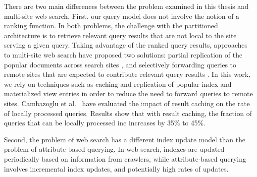 There are two main differences between the problem examined in this thesis and multi-site web search.
First, our query model does not involve the notion of a ranking function.
In both problems, the challenge with the partitioned architecture is to retrieve relevant query results that are not
local to the site serving a given query.
Taking advantage of the ranked query results, approaches to multi-site web search have proposed two solutions:
partial replication of the popular documents across search sites \cite{frances:multisiteefficiency},
and selectively forwarding queries to remote sites that are expected to contribute relevant query results
\cite{yates:multisitefeasibility, cambazoglu:multisiteforwarding}.
In this work, we rely on techniques such as caching and replication of popular index and materialized view entries in
order to reduce the need to forward queries to remote sites.
Cambazoglu et al.\ \cite{cambazoglu:multisiteforwarding} have evaluated the impact of result caching
on the rate of locally processed queries.
Results show that with result caching, the fraction of queries that can be locally processed inc increases by 35\% to 45\%.

Second, the problem of web search has a different index update model than the problem of attribute-based querying.
In web search, indexes are updated periodically based on information from crawlers,
while attribute-based querying involves incremental index updates,
and potentially high rates of updates.



